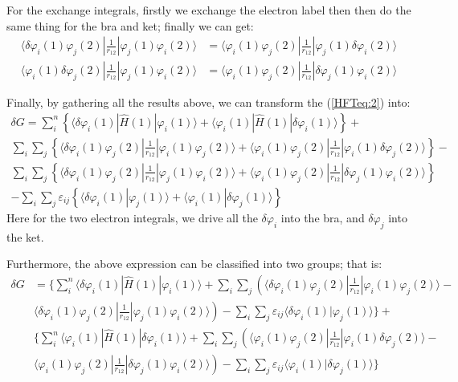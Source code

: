 For the exchange integrals, firstly we exchange the electron label
then then do the same thing for the bra and ket; finally we can get:
\begin{align}\label{}
\langle\delta\varphi_{i}(1)\varphi_{j}(2)|\frac{1}{r_{12}}|
\varphi_{j}(1)\varphi_{i}(2)\rangle &=
\langle\varphi_{i}(1)\varphi_{j}(2)|\frac{1}{r_{12}}|
\varphi_{j}(1)\delta\varphi_{i}(2)\rangle \nonumber \\
\langle\varphi_{i}(1)\delta\varphi_{j}(2)|\frac{1}{r_{12}}|
\varphi_{j}(1)\varphi_{i}(2)\rangle &=
\langle\varphi_{i}(1)\varphi_{j}(2)|\frac{1}{r_{12}}|
\delta\varphi_{j}(1)\varphi_{i}(2)\rangle
\end{align}

Finally, by gathering all the results above, we can transform the
(\ref{HFTeq:2}) into:
\begin{multline}\label{}
\delta G = \sum_{i}^{n} \left \{
\langle\delta\varphi_{i}(1)|\hat{H}(1)|\varphi_{i}(1)\rangle +
\langle\varphi_{i}(1)|\hat{H}(1)|\delta\varphi_{i}(1)\rangle
\right\} +  \\
\sum_{i}\sum_{j} \left\{
\langle\delta\varphi_{i}(1)\varphi_{j}(2)|\frac{1}{r_{12}}|\varphi_{i}(1)\varphi_{j}(2)\rangle
+
\langle\varphi_{i}(1)\varphi_{j}(2)|\frac{1}{r_{12}}|\varphi_{i}(1)\delta\varphi_{j}(2)\rangle
\right\} - \\
\sum_{i}\sum_{j} \left\{
\langle\delta\varphi_{i}(1)\varphi_{j}(2)|\frac{1}{r_{12}}|\varphi_{j}(1)\varphi_{i}(2)\rangle
+
\langle\varphi_{i}(1)\varphi_{j}(2)|\frac{1}{r_{12}}|\delta\varphi_{j}(1)\varphi_{i}(2)\rangle
\right\} \\
- \sum_{i}\sum_{j} \varepsilon_{ij}\left\{
\langle\delta\varphi_{i}(1)|\varphi_{j}(1)\rangle +
\langle\varphi_{i}(1)|\delta\varphi_{j}(1)\rangle
 \right\}
\end{multline}
Here for the two electron integrals, we drive all the
$\delta\varphi_{i}$ into the bra, and $\delta\varphi_{j}$ into the
ket.

Furthermore, the above expression can be classified into two groups;
that is:
\begin{equation}\label{HFTeq:33}
\begin{split}
\delta G  &=
\Bigg\{ \sum_{i}^{n}
\langle\delta\varphi_{i}(1)|\hat{H}(1)|\varphi_{i}(1)\rangle
 +
\sum_{i}\sum_{j} \left(
\langle\delta\varphi_{i}(1)\varphi_{j}(2)|\frac{1}{r_{12}}|
\varphi_{i}(1)\varphi_{j}(2)\rangle - \right. \\
&\left.\langle\delta\varphi_{i}(1)\varphi_{j}(2)|\frac{1}{r_{12}}|
\varphi_{j}(1)\varphi_{i}(2)\rangle \right) - \sum_{i}\sum_{j}
\varepsilon_{ij}
\langle\delta\varphi_{i}(1)|\varphi_{j}(1)\rangle \Bigg\} + \\
&\Bigg\{ \sum_{i}^{n}
\langle\varphi_{i}(1)|\hat{H}(1)|\delta\varphi_{i}(1)\rangle
 +
\sum_{i}\sum_{j} \left(
\langle\varphi_{i}(1)\varphi_{j}(2)|\frac{1}{r_{12}}|
\varphi_{i}(1)\delta\varphi_{j}(2)\rangle - \right. \\
&\left.\langle\varphi_{i}(1)\varphi_{j}(2)|\frac{1}{r_{12}}|
\delta\varphi_{j}(1)\varphi_{i}(2)\rangle \right) - \sum_{i}\sum_{j}
\varepsilon_{ij}
\langle\varphi_{i}(1)|\delta\varphi_{j}(1)\rangle\Bigg\}
\end{split}
\end{equation}

